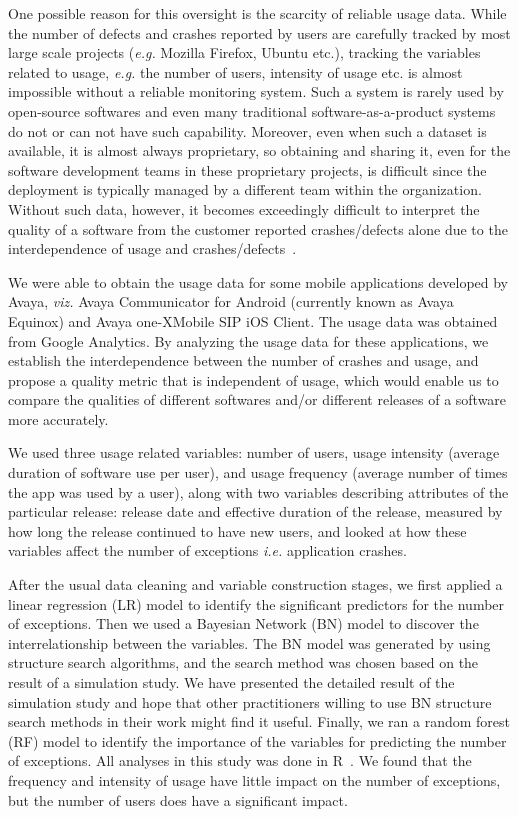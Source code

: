 \documentclass[smallextended]{svjour3}       %
\begin{document}
One possible reason for this oversight is the scarcity of reliable usage data. While the number of defects and crashes reported by users are carefully tracked by most large scale projects (\textit{e.g.} Mozilla Firefox, Ubuntu etc.), tracking the variables related to usage, \textit{e.g.} the number of users, intensity of usage etc. is almost impossible without a reliable monitoring system. Such a system is rarely used by open-source softwares and even many traditional software-as-a-product systems do not or can not have such capability. Moreover, even when such a dataset is available, it is almost always proprietary, so obtaining and sharing it, even for the software development teams in these proprietary projects, is difficult since the deployment is typically managed by a different team within the organization. Without such data, however, it becomes exceedingly difficult to interpret the quality of a software from the customer reported crashes/defects alone due to the interdependence of usage and crashes/defects~\cite{dey2018modeling,hmps15,IQ08}.

We were able to obtain the usage data for some mobile applications developed by Avaya, \textit{viz.}  Avaya Communicator for Android (currently known as Avaya Equinox\textregistered) and Avaya one-X\textregistered  Mobile SIP iOS Client. The usage data was obtained from Google Analytics. By analyzing the usage data for these applications, we establish the interdependence between the number of crashes and usage, and propose a quality metric that is independent of usage, which would enable us to compare the qualities of different softwares and/or different releases of a software more accurately. 

We used three usage related variables: number of users, 
usage intensity (average duration of software use per user), and usage frequency 
(average number of times the app was used by a user), along with two variables describing attributes 
of the particular release: release date and effective duration of the release, measured by how 
long the release continued to have new users, and looked at how these variables affect 
the number of exceptions \textit{i.e.} application crashes.  

After the usual data cleaning and variable construction stages, we first applied a linear regression (LR) model to identify the significant predictors for the number of exceptions. Then we used a Bayesian Network (BN) model to discover the interrelationship between the variables. The BN model was generated by using structure search algorithms, and the search method was chosen based on the result of a simulation study. We have presented the detailed result of the simulation study and hope that other practitioners willing to use BN structure search methods in their work might find it useful.  Finally, we ran a random forest (RF) model to identify the importance of the variables for predicting the number of exceptions. All analyses in this study was done in R~\cite{R}. We found that the frequency and intensity of usage have little impact on the number of exceptions, but the number of users does have a significant impact. 
\end{document}
